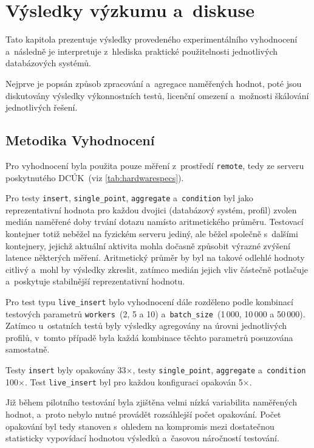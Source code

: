 \chapter{Výsledky výzkumu a~diskuse}\label{vysledky}
Tato kapitola prezentuje výsledky provedeného experimentálního vyhodnocení a~následně je interpretuje z~hlediska praktické použitelnosti jednotlivých databázových systémů. 

Nejprve je popsán způsob zpracování a~agregace naměřených hodnot, poté jsou diskutovány výsledky výkonnostních testů, licenční omezení a~možnosti škálování jednotlivých řešení.

\section{Metodika Vyhodnocení}
Pro vyhodnocení byla použita pouze měření z~prostředí \texttt{remote}, tedy ze serveru poskytnutého DCÚK~(viz \ref{tab:hardwarespecs}). 

Pro testy \texttt{insert}, \texttt{single\_point}, \texttt{aggregate} a~\texttt{condition}
byl jako reprezentativní hodnota pro každou dvojici (databázový systém, profil) zvolen medián naměřené doby trvání dotazu namísto aritmetického průměru. 
Testovací kontejner totiž neběžel na fyzickém serveru jediný, ale běžel společně s~dalšími kontejnery, jejichž aktuální aktivita mohla dočasně způsobit výrazné zvýšení latence některých měření. 
Aritmetický průměr by byl na takové odlehlé hodnoty citlivý a~mohl by výsledky zkreslit, zatímco medián jejich vliv částečně potlačuje a~poskytuje stabilnější reprezentativní hodnotu.

Pro test typu \texttt{live\_insert} bylo vyhodnocení dále rozděleno podle kombinací testových parametrů \texttt{workers}~(2, 5 a 10) a~\texttt{batch\_size}~(1\,000, 10\,000 a 50\,000). Zatímco u~ostatních testů byly výsledky agregovány na úrovni jednotlivých profilů, v~tomto případě byla každá kombinace těchto parametrů posuzována samostatně.

Testy \texttt{insert} byly opakovány 33$\times$, testy \texttt{single\_point}, \texttt{aggregate} a~\texttt{condition} 100$\times$. Test \texttt{live\_insert} byl pro každou konfiguraci opakován 5$\times$. 

Již během pilotního testování byla zjištěna velmi nízká variabilita naměřených hodnot, a~proto nebylo nutné provádět rozsáhlejší počet opakování. Počet opakování byl tedy stanoven s~ohledem na kompromis mezi dostatečnou statisticky vypovídací hodnotou výsledků a~časovou náročností testování.

